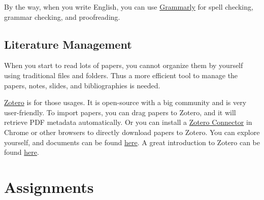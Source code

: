\documentclass[english]{../TexTemplate/thesis}
\begin{document}
By the way, when you write English, you can use \href{https://www.grammarly.com/}{Grammarly} for spell checking, grammar checking, and proofreading.

\subsection{Literature Management}
When you start to read lots of papers, you cannot organize them by yourself using traditional files and folders.
Thus a more efficient tool to manage the papers, notes, slides, and bibliographies is needed.

\href{https://www.zotero.org}{Zotero} is for those usages.
It is open-source with a big community and is very user-friendly.
To import papers, you can drag papers to Zotero, and it will retrieve PDF metadata automatically. Or you can install a \href{https://chrome.google.com/webstore/detail/zotero-connector/ekhagklcjbdpajgpjgmbionohlpdbjgc}{Zotero Connector} in Chrome or other browsers to directly download papers to Zotero. You can explore yourself, and documents can be found \href{https://www.zotero.org/support/}{here}.
A great introduction to Zotero can be found \href{https://speakerdeck.com/markding/collecting-organizing-and-citing-scientific-literature-an-intro-to-zotero}{here}.


\newpage
\section{Assignments}
\end{document}

